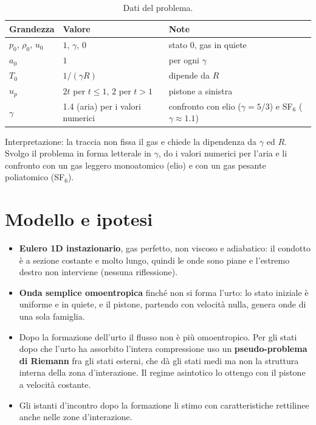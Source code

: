 \documentclass[11pt,a4paper]{article}
\begin{document}
\begin{table}[H]
  \centering
  \begin{tabular}{lll}
    \toprule
    Grandezza & Valore & Note \\
    \midrule
    $p_0$, $\rho_0$, $u_0$ & $1$, $\gamma$, $0$ & stato 0, gas in quiete \\
    $a_0$ & $1$ & per ogni $\gamma$ \\
    $T_0$ & $1/(\gamma R)$ & dipende da $R$ \\
    $u_p$ & $2t$ per $t\le1$, $2$ per $t>1$ & pistone a sinistra \\
    $\gamma$ & \num{1.4} (aria) per i valori numerici & confronto con elio ($\gamma=5/3$) e SF$_6$ ($\gamma\approx\num{1.1}$) \\
    \bottomrule
  \end{tabular}
  \caption{Dati del problema.}
\end{table}
Interpretazione: la traccia non fissa il gas e chiede la dipendenza da $\gamma$ ed $R$. Svolgo il problema in forma
letterale in $\gamma$, do i valori numerici per l'aria e li confronto con un gas leggero monoatomico (elio) e con
un gas pesante poliatomico (SF$_6$).

\section{Modello e ipotesi}
\begin{itemize}
\item \textbf{Eulero 1D instazionario}, gas perfetto, non viscoso e adiabatico: il condotto è a sezione costante e
  molto lungo, quindi le onde sono piane e l'estremo destro non interviene (nessuna riflessione).
\item \textbf{Onda semplice omoentropica} finché non si forma l'urto: lo stato iniziale è uniforme e in quiete,
  e il pistone, partendo con velocità nulla, genera onde di una sola famiglia.
\item Dopo la formazione dell'urto il flusso non è più omoentropico. Per gli stati dopo che l'urto ha assorbito
  l'intera compressione uso un \textbf{pseudo-problema di Riemann} fra gli stati esterni, che dà gli stati medi ma
  non la struttura interna della zona d'interazione. Il regime asintotico lo ottengo con il pistone a velocità
  costante.
\item Gli istanti d'incontro dopo la formazione li stimo con caratteristiche rettilinee anche nelle zone
  d'interazione.
\end{itemize}
\end{document}
